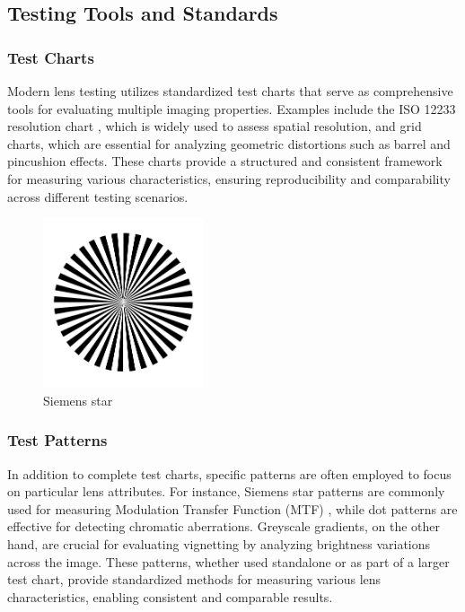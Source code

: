 \subsection{Testing Tools and Standards}

\subsubsection{Test Charts}  
Modern lens testing utilizes standardized test charts that serve as comprehensive tools for evaluating multiple imaging properties. Examples include the ISO 12233 resolution chart \cite{ISO12233}, which is widely used to assess spatial resolution, and grid charts, which are essential for analyzing geometric distortions such as barrel and pincushion effects. These charts provide a structured and consistent framework for measuring various characteristics, ensuring reproducibility and comparability across different testing scenarios.

\begin{figure}[htbp]
\centering
\includegraphics[height=5cm]{Images/siemens_star.png}
\caption{Siemens star \cite{siemens_star}}
\label{fig:siemens_star}
\end{figure}

\subsubsection{Test Patterns}  
In addition to complete test charts, specific patterns are often employed to focus on particular lens attributes. For instance, Siemens star patterns are commonly used for measuring Modulation Transfer Function (MTF) \cite{siemens_star}, while dot patterns are effective for detecting chromatic aberrations. Greyscale gradients, on the other hand, are crucial for evaluating vignetting by analyzing brightness variations across the image. These patterns, whether used standalone or as part of a larger test chart, provide standardized methods for measuring various lens characteristics, enabling consistent and comparable results.

